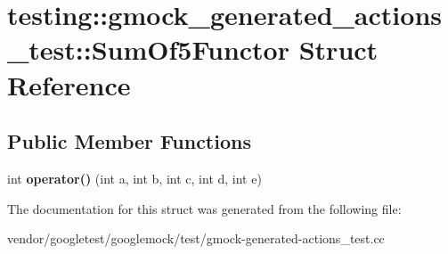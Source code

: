 \hypertarget{structtesting_1_1gmock__generated__actions__test_1_1_sum_of5_functor}{}\section{testing\+:\+:gmock\+\_\+generated\+\_\+actions\+\_\+test\+:\+:Sum\+Of5\+Functor Struct Reference}
\label{structtesting_1_1gmock__generated__actions__test_1_1_sum_of5_functor}
\subsection*{Public Member Functions}
\begin{DoxyCompactItemize}
\item 
\mbox{\label{structtesting_1_1gmock__generated__actions__test_1_1_sum_of5_functor_aa3d751efb237e12ecdf1528f2b73da04}} 
int {\bfseries operator()} (int a, int b, int c, int d, int e)
\end{DoxyCompactItemize}


The documentation for this struct was generated from the following file\+:\begin{DoxyCompactItemize}
\item 
vendor/googletest/googlemock/test/gmock-\/generated-\/actions\+\_\+test.\+cc\end{DoxyCompactItemize}
